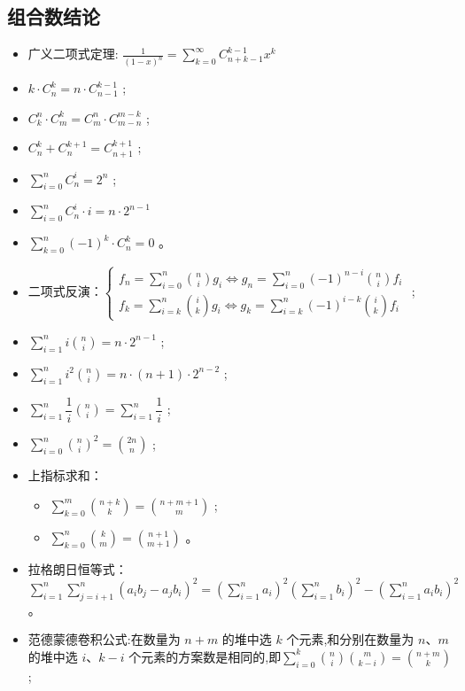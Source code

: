 \subsection{组合数结论}
\begin{itemize}
    \item 广义二项式定理: $\frac{1}{(1 - x)^n} = \sum \limits _{k = 0}^{\infty} C^{k - 1}_{n + k - 1} x^k$
    \item $k  \cdot C^k_n=n \cdot C^{k-1}_{n-1}$ ;
    \item $C_k^n \cdot C_m^k=C_m^n \cdot C_{m-n}^{m-k}$ ;
    \item $C_n^k+C_n^{k+1}=C_{n+1}^{k+1}$ ;
    \item $\displaystyle\sum_{i=0}^n C_n^i=2^n$ ;
    \item $\displaystyle\sum^n_{i=0}C^i_n \cdot i = n \cdot 2^{n - 1}$
    \item $\displaystyle\sum_{k=0}^n(-1)^k \cdot C_n^k=0$ 。
    \item 二项式反演：$\left\{\begin{matrix} \displaystyle f_n=\sum_{i=0}^n{n\choose i}g_i\Leftrightarrow g_n=\sum_{i=0}^n(-1)^{n-i}{n\choose i}f_i \\ 
                    \displaystyle f_k=\sum_{i=k}^n{i\choose k}g_i\Leftrightarrow g_k=\sum_{i=k}^n(-1)^{i-k}{i\choose k}f_i \end{matrix}\right. $ ;
    \item $\displaystyle \sum_{i=1}^{n}i{n\choose i}=n  \cdot  2^{n-1}$ ;
    \item $\displaystyle \sum_{i=1}^{n}i^2{n\choose i}=n \cdot (n+1) \cdot 2^{n-2}$ ;
    \item $\displaystyle \sum_{i=1}^{n}\dfrac{1}{i}{n\choose i}=\sum_{i=1}^{n}\dfrac{1}{i}$ ;
    \item $\displaystyle \sum_{i=0}^{n}{n\choose i}^2={2n\choose n}$ ;
    \item 上指标求和：
        \begin{itemize}
            \item $\displaystyle  \sum_{k=0}^{m} \binom{n+k}{k} = \binom{n+m+1}{m}$ ;
            \item $\displaystyle  \sum_{k=0}^{n} \binom{k}{m} = \binom{n+1}{m+1}$ 。
        \end{itemize}
    \item 拉格朗日恒等式：$\displaystyle \sum_{i=1}^{n}\sum_{j=i+1}^{n}(a_ib_j-a_jb_i)^2=(\sum_{i=1}^{n}a_i)^2(\sum_{i=1}^{n}b_i)^2-(\sum_{i=1}^{n}a_ib_i)^2$ 。
    \item 范德蒙德卷积公式:在数量为 $n+m$ 的堆中选 $k$ 个元素,和分别在数量为 $n、m$ 的堆中选 $i、k-i$ 个元素的方案数是相同的,即$\displaystyle{\sum_{i=0}^k\binom{n}{i}\binom{m}{k-i}=\binom{n+m}{k}}$ ;

\end{itemize}
